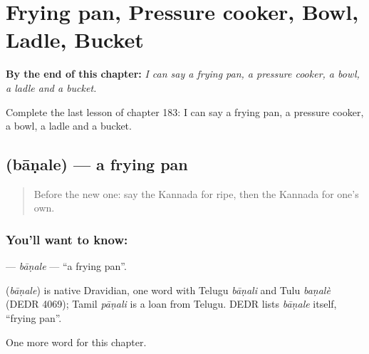 
\chapter{Frying pan, Pressure cooker, Bowl, Ladle, Bucket}
\label{ch:ka-frying-pan-pressure-cooker-bowl-ladle-bucket}

\begin{chapteropening}
\textbf{By the end of this chapter:} \emph{I can say a frying pan, a pressure cooker, a bowl, a ladle and a bucket.}

Complete the last lesson of chapter 183: I can say a frying pan, a pressure cooker, a bowl, a ladle and a bucket.
\end{chapteropening}

\section[\texorpdfstring{\kn{ಬಾಣಲೆ} (bāṇale)}{ಬಾಣಲೆ (bāṇale)}]{ (bāṇale) — a frying pan}

\label{lesson:KA-C183-banale}



\begin{quote}
Before the new one: say the Kannada for ripe, then the Kannada for one's own.
\end{quote}

\subsection*{You'll want to know: }
\textbf{} — \emph{bāṇale} — \textquotedblleft{}a frying pan\textquotedblright{}.

\begin{cousinweb}
\textbf{} (\emph{bāṇale}) is native Dravidian, one word with Telugu \emph{bāṇali} and Tulu \emph{baṇalè} (DEDR 4069); Tamil \emph{pāṇali} is a loan from Telugu. DEDR lists \emph{bāṇale} itself, \textquotedblleft{}frying pan\textquotedblright{}.
\end{cousinweb}

\begin{grammarlens}[title={What you've built}]
One more word for this chapter.
\end{grammarlens}

